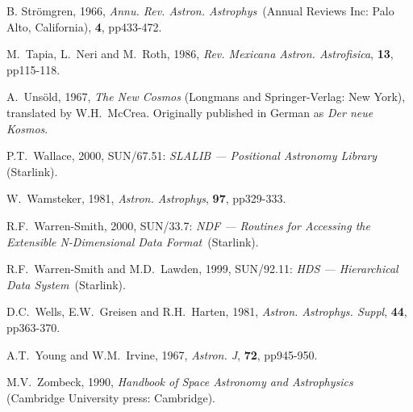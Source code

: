 \documentclass[twoside,11pt]{article}
\newcommand{\xref}[3]{#1}
\begin{document}
\begin{thebibliography}{99}
   B. Str\"{o}mgren, 1966, {\it Annu. Rev. Astron.
   Astrophys}\, (Annual Reviews Inc: Palo Alto, California), {\bf 4},
   pp433-472.

   M.~Tapia, L.~Neri and M.~Roth, 1986, {\it Rev.
   Mexicana Astron. Astrofisica}, {\bf 13}, pp115-118.

   A.~Uns\"{o}ld, 1967, {\it The New Cosmos}
   (Longmans and Springer-Verlag: New York), translated by W.H.~McCrea.
   Originally published in German as {\it Der neue Kosmos}.

   P.T.~Wallace, 2000, \xref{SUN/67.51}{sun67}{}: {\it
   SLALIB --- Positional Astronomy Library}\, (Starlink).

   W.~Wamsteker, 1981, {\it Astron. Astrophys},
   {\bf 97}, pp329-333.

   R.F.~Warren-Smith, 2000, \xref{SUN/33.7}{sun33}{}:
   {\it NDF --- Routines for Accessing the Extensible N-Dimensional Data
   Format}\, (Starlink).

   R.F.~Warren-Smith and M.D.~Lawden, 1999,
   \xref{SUN/92.11}{sun92}{}: {\it HDS --- Hierarchical Data System}\,
   (Starlink).

   D.C.~Wells, E.W.~Greisen and R.H.~Harten, 1981,
   {\it Astron. Astrophys. Suppl}, {\bf 44}, pp363-370.

   A.T.~Young and W.M.~Irvine, 1967, {\it Astron.
   J}, {\bf 72}, pp945-950.

   M.V.~Zombeck, 1990, {\it Handbook of Space
   Astronomy and Astrophysics}\, (Cambridge University press: Cambridge).


\end{thebibliography}


\typeout{  }
\typeout{*****************************************************}
\typeout{  }
\typeout{  }
\typeout{*****************************************************}
\typeout{  }
\end{document}
